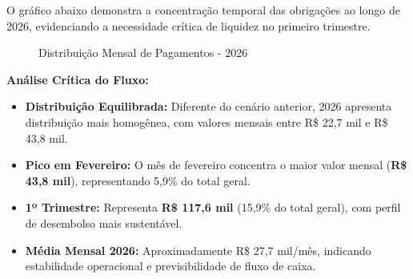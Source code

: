 \documentclass[12pt, a4paper]{article}
\begin{document}
O gráfico abaixo demonstra a concentração temporal das obrigações ao longo de 2026, evidenciando a necessidade crítica de liquidez no primeiro trimestre.

\begin{figure}[H]
    \centering
    \caption{Distribuição Mensal de Pagamentos - 2026}
\end{figure}

\vspace{0.5cm}

\textbf{Análise Crítica do Fluxo:}
\begin{itemize}
    \item \textbf{Distribuição Equilibrada:} Diferente do cenário anterior, 2026 apresenta distribuição mais homogênea, com valores mensais entre R\$ 22,7 mil e R\$ 43,8 mil.
    \item \textbf{Pico em Fevereiro:} O mês de fevereiro concentra o maior valor mensal (\textbf{R\$ 43,8 mil}), representando 5,9\% do total geral.
    \item \textbf{1º Trimestre:} Representa \textbf{R\$ 117,6 mil} (15,9\% do total geral), com perfil de desembolso mais sustentável.
    \item \textbf{Média Mensal 2026:} Aproximadamente R\$ 27,7 mil/mês, indicando estabilidade operacional e previsibilidade de fluxo de caixa.
\end{itemize}
\end{document}
